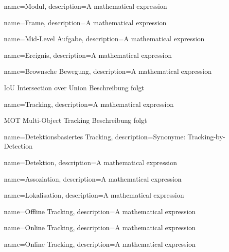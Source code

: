 
{
        name=Modul,
        description={A mathematical expression}
}

{
        name=Frame,
        description={A mathematical expression}
}

{
        name=Mid-Level Aufgabe,
        description={A mathematical expression}
}

{
        name=Ereignis,
        description={A mathematical expression}
}


{
        name=Brownsche Bewegung,
        description={A mathematical expression}
}

\newglossaryentrywithacronym
{IoU}
{Intersection over Union}
{Beschreibung folgt}


{
        name=Tracking,
        description={A mathematical expression}
}

\newglossaryentrywithacronym
{MOT}
{Multi-Object Tracking}
{Beschreibung folgt}

{
        name=Detektionsbasiertes Tracking,
        description={Synonyme: Tracking-by-Detection}
}

{
        name=Detektion,
        description={A mathematical expression}
}

{
        name=Assoziation,
        description={A mathematical expression}
}

{
        name=Lokalisation,
        description={A mathematical expression}
}

{
        name=Offline Tracking,
        description={A mathematical expression}
}

{
        name=Online Tracking,
        description={A mathematical expression}
}

{
        name=Online Tracking,
        description={A mathematical expression}
}

